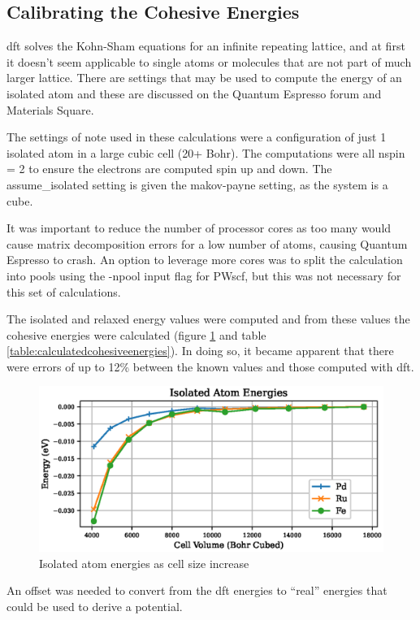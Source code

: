 \subsection{Calibrating the Cohesive Energies}

\acrlong{dft} solves the Kohn-Sham equations for an infinite repeating lattice, and at first it doesn't seem applicable to single atoms or molecules that are not part of much larger lattice.  There are settings that may be used to compute the energy of an isolated atom and these are discussed on the Quantum Espresso forum\cite{qeforum} and Materials Square\cite{materialssquaresingleatom}. 

The settings of note used in these calculations were a configuration of just 1 isolated atom in a large cubic cell (20+ Bohr).  The computations were all nspin = 2 to ensure the electrons are computed spin up and down.  The assume\_isolated setting is given the makov-payne setting, as the system is a cube.

It was important to reduce the number of processor cores as too many would cause matrix decomposition errors for a low number of atoms, causing Quantum Espresso to crash.  An option to leverage more cores was to split the calculation into pools using the -npool input flag for PWscf, but this was not necessary for this set of calculations.


The isolated and relaxed energy values were computed and from these values the cohesive energies were calculated (figure \ref{fig:isolatedatoms} and table \ref{table:calculatedcohesiveenergies}).  In doing so, it became apparent that there were errors of up to 12\% between the known values and those computed with \acrshort{dft}.

\begin{figure}[h]
\begin{center}
\includegraphics[width=0.5\linewidth]{chapters/potentials_fe_pd_ru/isolated/isolated_63.eps}
\caption{Isolated atom energies as cell size increase}
\label{fig:isolatedatoms}
\end{center}
\end{figure}

An offset was needed to convert from the \acrshort{dft} energies to \enquote{real} energies that could be used to derive a potential.

